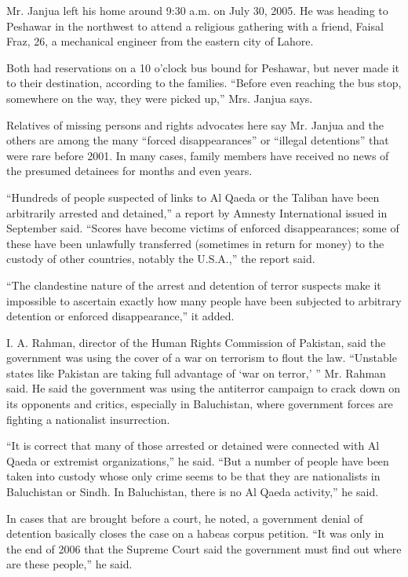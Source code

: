 Mr. Janjua left his home around 9:30 a.m. on July 30, 2005. He was
heading to Peshawar in the northwest to attend a religious gathering
with a friend, Faisal Fraz, 26, a mechanical engineer from the eastern
city of Lahore.

Both had reservations on a 10 o'clock bus bound for Peshawar, but never
made it to their destination, according to the families. ``Before even
reaching the bus stop, somewhere on the way, they were picked up,'' Mrs.
Janjua says.

Relatives of missing persons and rights advocates here say Mr. Janjua
and the others are among the many ``forced disappearances'' or ``illegal
detentions'' that were rare before 2001. In many cases, family members
have received no news of the presumed detainees for months and even
years.

``Hundreds of people suspected of links to Al Qaeda or the Taliban have
been arbitrarily arrested and detained,'' a report by Amnesty
International issued in September said. ``Scores have become victims of
enforced disappearances; some of these have been unlawfully transferred
(sometimes in return for money) to the custody of other countries,
notably the U.S.A.,'' the report said.

``The clandestine nature of the arrest and detention of terror suspects
make it impossible to ascertain exactly how many people have been
subjected to arbitrary detention or enforced disappearance,'' it added.

I. A. Rahman, director of the Human Rights Commission of Pakistan, said
the government was using the cover of a war on terrorism to flout the
law. ``Unstable states like Pakistan are taking full advantage of `war
on terror,' '' Mr. Rahman said. He said the government was using the
antiterror campaign to crack down on its opponents and critics,
especially in Baluchistan, where government forces are fighting a
nationalist insurrection.

``It is correct that many of those arrested or detained were connected
with Al Qaeda or extremist organizations,'' he said. ``But a number of
people have been taken into custody whose only crime seems to be that
they are nationalists in Baluchistan or Sindh. In Baluchistan, there is
no Al Qaeda activity,'' he said.

In cases that are brought before a court, he noted, a government denial
of detention basically closes the case on a habeas corpus petition. ``It
was only in the end of 2006 that the Supreme Court said the government
must find out where are these people,'' he said.

